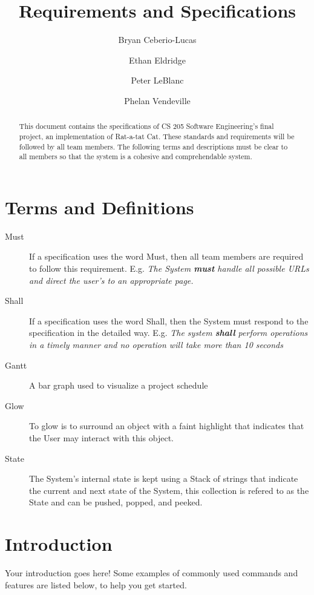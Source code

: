 \documentclass[12pt]{IEEEtran}
\title{Requirements and Specifications}
\author{Bryan Ceberio-Lucas \and Ethan Eldridge \and Peter LeBlanc \and Phelan Vendeville }
\begin{document}
\maketitle

\begin{abstract}
This document contains the specifications of CS 205 Software  Engineering's final project, an implementation of Rat-a-tat Cat. These standards and requirements will be followed by all team members. The following terms and descriptions must be clear to all members so that the system is a cohesive and comprehendable system.
\end{abstract}

\tableofcontents

\section{Terms and Definitions}
\label{sec:TermsDefinitions}
\begin{description}
	\item[Must] If a specification uses the word Must, then all team members are required to follow this requirement. E.g.  \textit{The System \textbf{must} handle all possible URLs and direct the user's to an appropriate page.} 
	\item[Shall] If a specification uses the word Shall, then the System must respond to the specification in the detailed way. E.g. \textit{The system \textbf{shall} perform operations in a timely manner and no operation will take more than 10 seconds}
	\item[Gantt] A bar graph used to visualize a project schedule
	\item[Glow] To glow is to surround an object with a faint highlight that indicates that the User may interact with this object.
	\item[State] The System's internal state is kept using a Stack of strings that indicate the current and next state of the System, this collection is refered to as the State and can be pushed, popped, and peeked.
\end{description}

\section{Introduction}

Your introduction goes here! Some examples of commonly used commands and features are listed below, to help you get started.
\end{document}
